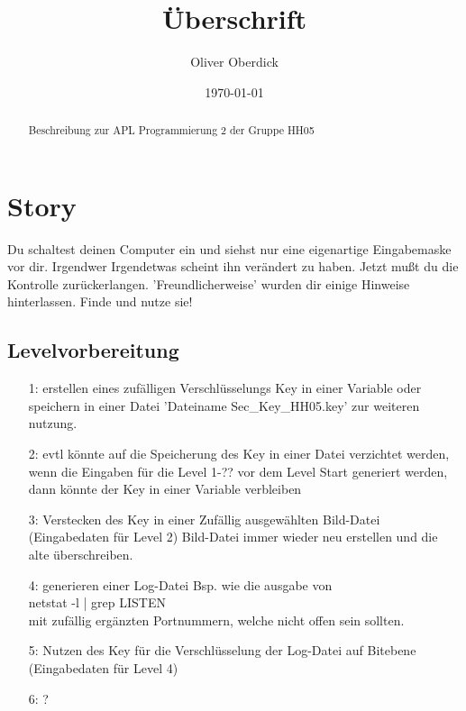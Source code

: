 \documentclass[a4paper 11pt]{article}
\title{\textbf{Überschrift}} %
\author{Oliver Oberdick} %
\date{\today} %
\begin{document}
\maketitle

\begin{abstract}
\begin{center}
Beschreibung zur APL Programmierung 2 der Gruppe HH05
\end{center}
\end{abstract}

\tableofcontents

\thispagestyle{empty}

\newpage
\pagestyle{plain}
\normalsize

\setcounter{page}{1} %

\section{Story}

Du schaltest deinen Computer ein und siehst nur eine eigenartige Eingabemaske vor dir.
Irgendwer \/ Irgendetwas scheint ihn verändert zu haben.
Jetzt mußt du die Kontrolle zurückerlangen. 'Freundlicherweise' wurden dir einige Hinweise
hinterlassen.
Finde und nutze sie!

\subsection{Levelvorbereitung}

\begin{enumerate}
\addtolength{\itemindent}{0.80cm}
\itemsep0em

\item[1:] erstellen eines zufälligen Verschlüsselungs Key in einer Variable oder speichern in einer Datei 'Dateiname\: Sec\_Key\_HH05.key' zur weiteren nutzung.
\item[2:] evtl könnte auf die Speicherung des Key in einer Datei verzichtet werden, wenn die Eingaben für die Level 1-?? vor dem Level Start generiert werden, dann könnte der Key in einer Variable verbleiben
\item[3:] Verstecken des Key in einer Zufällig ausgewählten Bild-Datei (Eingabedaten für Level 2) Bild-Datei immer wieder neu erstellen und die alte überschreiben.
\item[4:] generieren einer Log-Datei Bsp. wie die ausgabe von \\
netstat -l | grep LISTEN \\
mit zufällig ergänzten Portnummern, welche nicht offen sein sollten.
\item[5:] Nutzen des Key für die Verschlüsselung der Log-Datei auf Bitebene (Eingabedaten für Level 4)
\item[6:] ?

\end{enumerate}
\end{document}
